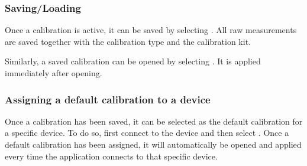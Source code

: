 \documentclass[a4paper,11pt]{article}
\newcommand{\screenshot}[2]{\begin{center}
\texttt{[image: Screenshots/\#2]}
\end{center}}
\begin{document}

\subsubsection{Saving/Loading}
Once a calibration is active, it can be saved by selecting . All raw measurements are saved together with the calibration type and the calibration kit.

Similarly, a saved calibration can be opened by selecting . It is applied immediately after opening.

\subsubsection{Assigning a default calibration to a device}
Once a calibration has been saved, it can be selected as the default calibration for a specific device. To do so, first connect to the device and then select . Once a default calibration has been assigned, it will automatically be opened and applied every time the application connects to that specific device.
\end{document}
